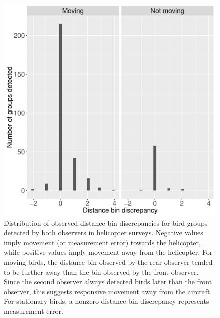 \documentclass[aoas,preprint]{imsart}
\numberwithin{equation}{section}
\theoremstyle{plain}
\begin{document}
\begin{figure}
\begin{center}
\includegraphics[width=150mm]{Dist_error_hists_JABES.pdf}
\caption{Distribution of observed distance bin discrepancies for bird groups detected by both observers in helicopter surveys. Negative values imply movement (or measurement error) towards the helicopter, while positive values imply movement away from the helicopter. For moving birds, the distance bin observed by the rear observer tended to be further away than the bin observed by the front observer.  Since the second observer always detected birds later than the front observer, this suggests responsive movement away from the aircraft. For stationary birds, a nonzero distance bin discrepancy represents measurement error.}
\label{fig:dist_hists}
\end{center}
\end{figure}
\end{document}
